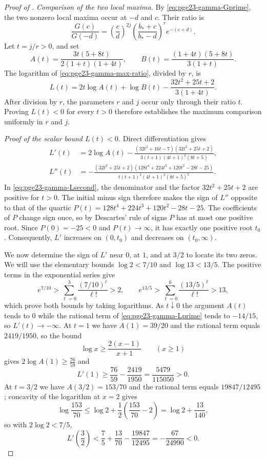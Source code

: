 \documentclass[11pt]{article}
\theoremstyle{remark}
\numberwithin{equation}{section}
\begin{document}
\begin{proof}[Proof of ]
  \smallskip
  \noindent\emph{Comparison of the two local maxima.}
  By \eqref{eq:pge23-gamma-Gprime}, the two nonzero local maxima occur at
  $-d$ and $c$.
  Their ratio is
  \begin{equation}\label{eq:pge23-gamma-max-ratio}
    \frac{G(c)}{G(-d)}
    =\left(\frac {c}{d}\right)^{2j}
    \left(\frac{b_*+c}{b_*-d}\right)^r e^{-(c+d)}.
  \end{equation}
  Let $t=j/r>0$, and set
  \[
    A(t)=\frac{3t(5+8t)}{2(1+t)(1+4t)},
    \qquad
    B(t)=\frac{(1+4t)(5+8t)}{3(1+t)}.
  \]
  The logarithm of \eqref{eq:pge23-gamma-max-ratio}, divided by $r$, is
  \[
    L(t)=2t\log A(t)+\log B(t)
      -\frac{32t^2+25t+2}{3(1+4t)}.
  \]
  After division by $r$, the parameters $r$ and $j$ occur only through
  their ratio $t$. Proving $L(t)<0$ for every $t>0$ therefore establishes
  the maximum comparison uniformly in $r$ and $j$.

  \smallskip
  \noindent\emph{Proof of the scalar bound $L(t)<0$.}
  Direct differentiation gives
  \begin{align}
    L'(t)
    &=2\log A(t)
    -\frac{(32t^2+16t-7)(32t^2+25t+2)}
    {3(t+1)(4t+1)^2(8t+5)},\label{eq:pge23-gamma-Lprime}\\
    L''(t)
    &=-\frac{(32t^2+25t+2)
    (128t^4+224t^3+120t^2-28t-25)}
    {t(t+1)^2(4t+1)^3(8t+5)^2}.
    \label{eq:pge23-gamma-Lsecond}
  \end{align}
  In \eqref{eq:pge23-gamma-Lsecond}, the denominator and the factor
  $32t^2+25t+2$ are positive for $t>0$. The initial minus sign therefore
  makes the sign of $L''$ opposite to that of the quartic
  $P(t)=128t^4+224t^3+120t^2-28t-25$.
  The coefficients of $P$ change sign once, so by Descartes' rule of signs $P$ has at most one positive root.
  Since $P(0)=-25<0$ and $P(t)\to\infty$, it has exactly one positive
  root $t_0$. Consequently, $L'$ increases on $(0,t_0)$ and decreases on
  $(t_0,\infty)$.

  We now determine the sign of $L'$ near $0$, at $1$, and at $3/2$
  to locate its two zeros.
  We will use the elementary bounds $\log2<7/10$ and
  $\log13<13/5$. The positive terms in the exponential series give
  \[
    e^{7/10}>\sum_{\ell=0}^{3}\frac{(7/10)^\ell}{\ell!}>2,
    \qquad
    e^{13/5}>\sum_{\ell=0}^{6}\frac{(13/5)^\ell}{\ell!}>13,
  \]
  which prove both bounds by taking logarithms.
  As $t\downarrow0$ the argument $A(t)$ tends to $0$ while the rational term of \eqref{eq:pge23-gamma-Lprime} tends to $-14/15$, so $L'(t)\to-\infty$.
  At $t=1$ we have $A(1)=39/20$ and the rational term equals $2419/1950$, so the bound
  \[
    \log x\ge\frac{2(x-1)}{x+1}\qquad(x\ge1)
  \]
  gives $2\log A(1)\ge\frac{76}{59}$ and
  \[
    L'(1)\ge\frac{76}{59}-\frac{2419}{1950}
    =\frac{5479}{115050}>0.
  \]
  At $t=3/2$ we have $A(3/2)=153/70$ and the rational term equals $19847/12495$; concavity of the logarithm at $x=2$ gives
  \[
    \log\frac{153}{70}\le\log2+\frac{1}{2}\left(\frac{153}{70}-2\right)
    =\log2+\frac{13}{140},
  \]
  so with $2 \log 2 < 7/5$,
  \[
    L'\left(\frac{3}{2}\right)
    <\frac{7}{5} + \frac{13}{70}-\frac{19847}{12495}
    =-\frac{67}{24990}<0.
  \]


\end{proof}
\end{document}
